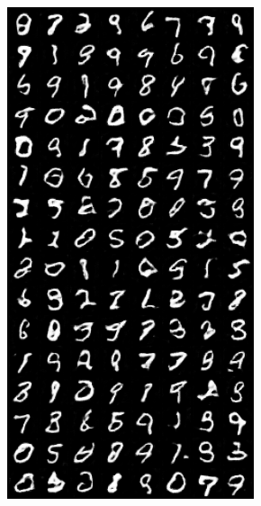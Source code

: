 \begin{figure}[H]
\begin{subfigure}{0.2\textwidth}
        \centering
        \includegraphics[width=0.95\linewidth]{init/fake_sample_epoch_0010.png}
        \caption{}
        \label{subfig:init/fake_sample_epoch_0010}
    \end{subfigure}%
    \begin{subfigure}{0.2\textwidth}
        \centering

\end{subfigure}
\end{figure}
